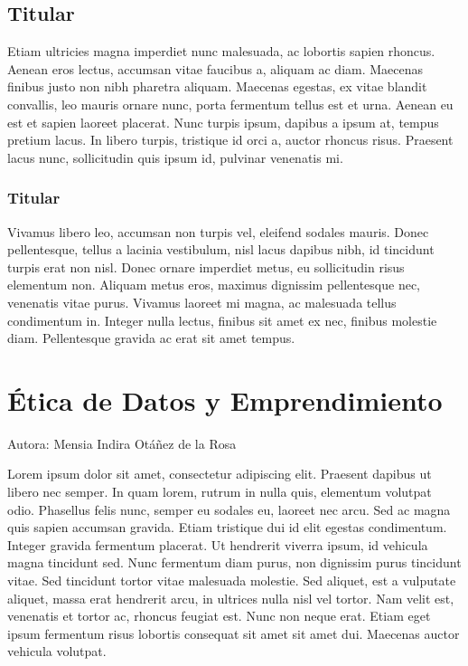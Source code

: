 \documentclass[
  letterpaper,
  DIV=11,
  numbers=noendperiod]{scrreprt}
\begin{document}
\hypertarget{titular-10}{%
\section{Titular}\label{titular-10}}

Etiam ultricies magna imperdiet nunc malesuada, ac lobortis sapien
rhoncus. Aenean eros lectus, accumsan vitae faucibus a, aliquam ac diam.
Maecenas finibus justo non nibh pharetra aliquam. Maecenas egestas, ex
vitae blandit convallis, leo mauris ornare nunc, porta fermentum tellus
est et urna. Aenean eu est et sapien laoreet placerat. Nunc turpis
ipsum, dapibus a ipsum at, tempus pretium lacus. In libero turpis,
tristique id orci a, auctor rhoncus risus. Praesent lacus nunc,
sollicitudin quis ipsum id, pulvinar venenatis mi.

\hypertarget{titular-11}{%
\subsection{Titular}\label{titular-11}}

Vivamus libero leo, accumsan non turpis vel, eleifend sodales mauris.
Donec pellentesque, tellus a lacinia vestibulum, nisl lacus dapibus
nibh, id tincidunt turpis erat non nisl. Donec ornare imperdiet metus,
eu sollicitudin risus elementum non. Aliquam metus eros, maximus
dignissim pellentesque nec, venenatis vitae purus. Vivamus laoreet mi
magna, ac malesuada tellus condimentum in. Integer nulla lectus, finibus
sit amet ex nec, finibus molestie diam. Pellentesque gravida ac erat sit
amet tempus.


\hypertarget{uxe9tica-de-datos-y-emprendimiento}{%
\chapter{Ética de Datos y
Emprendimiento}\label{uxe9tica-de-datos-y-emprendimiento}}

Autora: Mensia Indira Otáñez de la Rosa

Lorem ipsum dolor sit amet, consectetur adipiscing elit. Praesent
dapibus ut libero nec semper. In quam lorem, rutrum in nulla quis,
elementum volutpat odio. Phasellus felis nunc, semper eu sodales eu,
laoreet nec arcu. Sed ac magna quis sapien accumsan gravida. Etiam
tristique dui id elit egestas condimentum. Integer gravida fermentum
placerat. Ut hendrerit viverra ipsum, id vehicula magna tincidunt sed.
Nunc fermentum diam purus, non dignissim purus tincidunt vitae. Sed
tincidunt tortor vitae malesuada molestie. Sed aliquet, est a vulputate
aliquet, massa erat hendrerit arcu, in ultrices nulla nisl vel tortor.
Nam velit est, venenatis et tortor ac, rhoncus feugiat est. Nunc non
neque erat. Etiam eget ipsum fermentum risus lobortis consequat sit amet
sit amet dui. Maecenas auctor vehicula volutpat.
\end{document}
